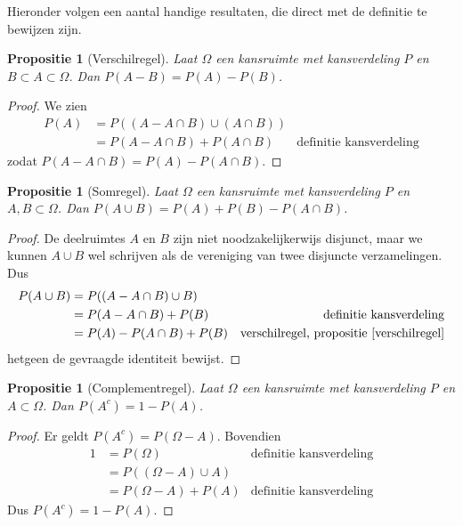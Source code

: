 \documentclass[a4paper]{report}
\newtheorem{proposition}[theorem]{Propositie}
\theoremstyle{definition}
\begin{document}
Hieronder volgen een aantal handige resultaten, die direct met de definitie te bewijzen zijn.
\begin{proposition}[Verschilregel]
    \label{verschilregel}
    Laat $\Omega$ een kansruimte met kansverdeling $P$ en $B \subset A \subset \Omega$.
    Dan $P(A - B) = P(A) - P(B)$.
\end{proposition}
\begin{proof}
    We zien
    \begin{align*}
        P(A)    &= P( (A - A \cap B) \cup (A \cap B) ) \\
                &= P(A - A \cap B ) + P(A \cap B) & \text{definitie kansverdeling}
    \end{align*}
    zodat $P(A - A \cap B ) = P(A) - P(A \cap B) $.
\end{proof}

\begin{proposition}[Somregel]
    \label{somregel}
    Laat $\Omega$ een kansruimte met kansverdeling $P$ en $A,B \subset \Omega$.
    Dan $P(A \cup B) = P(A) + P(B) - P(A \cap B)$.
\end{proposition}
\begin{proof}
    De deelruimtes $A$ en $B$ zijn niet noodzakelijkerwijs disjunct, maar we kunnen $A \cup B$ wel schrijven als de vereniging van twee disjuncte verzamelingen.
    Dus
    \begin{align*}
        P(A \cup B)     &= P( (A - A \cap B) \cup B) \\
                        &= P(A - A \cap B) + P(B)  & \text{definitie kansverdeling}\\
                        &= P(A) - P(A \cap B) + P(B) & \text{verschilregel, propositie~\ref{verschilregel}}
    \end{align*}
    hetgeen de gevraagde identiteit bewijst.
\end{proof}

\begin{proposition}[Complementregel]
    \label{complementregel}
    Laat $\Omega$ een kansruimte met kansverdeling $P$ en $A \subset \Omega$.
    Dan $P(A^c) = 1 - P(A)$.
\end{proposition}
\begin{proof}
    Er geldt $P(A^c) = P(\Omega - A)$.
    Bovendien
    \begin{align*}
        1 &= P(\Omega) & \text{definitie kansverdeling}\\
          &= P( (\Omega - A) \cup A) \\
          &= P(\Omega - A) + P(A) & \text{definitie kansverdeling}
    \end{align*}
    Dus $P(A^c) = 1 - P(A)$.
\end{proof}
\end{document}
